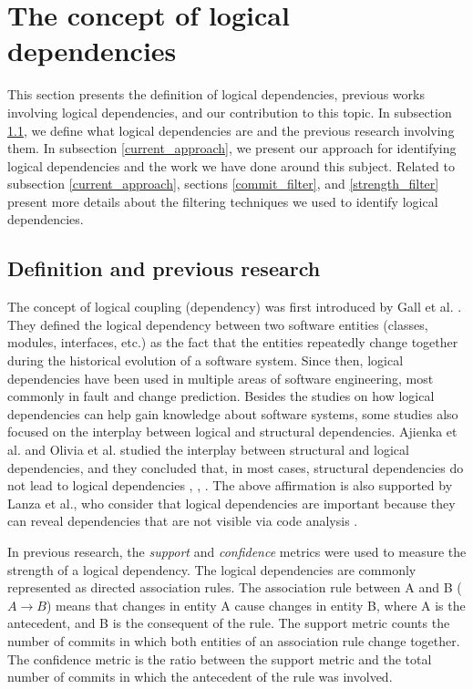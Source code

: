 \documentclass[runningheads]{comsis2}
\begin{document}
\section{The concept of logical dependencies}

This section presents the definition of logical dependencies, previous works involving logical dependencies, and our contribution to this topic. In subsection \ref{definition_ld}, we define what logical dependencies are and the previous research involving them. In subsection \ref{current_approach}, we present our approach for identifying logical dependencies and the work we have done around this subject. Related to subsection \ref{current_approach}, sections \ref{commit_filter}, and \ref{strength_filter} present more details about the filtering techniques we used to identify logical dependencies.

\subsection{Definition and previous research}
\label{definition_ld}
The concept of logical coupling (dependency) was first introduced by Gall et al. \cite{Gall:1998:DLC:850947.853338}. They defined the logical dependency between two software entities (classes, modules, interfaces, etc.) as the fact that the entities repeatedly change together during the historical evolution of a software system.
Since then, logical dependencies have been used in multiple areas of software engineering, most commonly in fault and change prediction.  
Besides the studies on how logical dependencies can help gain knowledge about software systems, some studies also focused on the interplay between logical and structural dependencies. Ajienka et al. and Olivia et al. studied the interplay between structural and logical dependencies, and they concluded that, in most cases, structural dependencies do not lead to logical dependencies \cite{Oliva:2011:ISL:2067853.2068086}, \cite{DBLP:conf/issre/OlivaG15}, \cite{DBLP:journals/jss/AjienkaC17}. The above affirmation is also supported by Lanza et al., who consider that logical dependencies are important because they can reveal dependencies that are not visible via code analysis \cite{inproceedings_radar_evolution}.



In previous research, the \textit{support} and \textit{confidence} metrics were used to measure the strength of a logical dependency. 
The logical dependencies are commonly represented as directed association rules. The association rule between A and B ( $A \rightarrow B$) means that changes in entity A cause changes in entity B, where A is the antecedent, and B is the consequent of the rule. 
The support metric counts the number of commits in which both entities of an association rule change together. The confidence metric is the ratio between the support metric and the total number of commits in which the antecedent of the rule was involved. 
\end{document}

